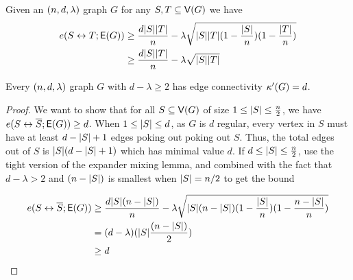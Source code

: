 \documentclass[11pt]{article}
\begin{document}
\begin{lemma}\label{lemma:expanders-mixing-lemma}
  Given an $(n, d, \lambda)$ graph $G$ for any $S, T \subseteq \mathsf{V}(G)$ we have
\begin{align*}
  e(S \leftrightarrow T; \mathsf{E}(G)) &\geq \frac{d|S||T|}{n} - \lambda\sqrt{|S||T| (1 - \frac{|S|}{n}) (1 - \frac{|T|}{n})   }	\\
  &\geq \frac{d|S||T|}{n} - \lambda\sqrt{|S||T| }
\end{align*}

\end{lemma}
\begin{lemma}\label{lemma:edge-connectivity-pseudorandom}
Every $(n, d, \lambda)$ graph $G$ with $d - \lambda \geq 2$ has edge connectivity $\kappa'(G) = d$.
\end{lemma}
\begin{proof}
  We want to show that for all $S \subseteq \mathsf{V}(G)$ of size $1 \leq |S| \leq \frac{n}{2}$, we have $e(S \leftrightarrow \overline{S}; \mathsf{E}(G)) \geq d$.
  When $1\leq |S| \leq d$, as $G$ is $d$ regular, every vertex in $S$ must have at least $d- |S| + 1$ edges poking out poking out $S$.
  Thus, the total edges out of $S$ is $|S|(d- |S| + 1)$ which has minimal value $d$.
  If $d \leq |S| \leq \frac{n}{2}$, use the tight version of the expander mixing lemma, and combined with the  fact that $d- \lambda > 2$ and $(n-|S|)$ is smallest when $|S| = n/2$ to get the bound

  \begin{align*}
    e(S \leftrightarrow \overline{S}; \mathsf{E}(G)) &\geq \frac{d|S|(n-|S|)}{n} - \lambda\sqrt{|S|(n-|S|) (1 - \frac{|S|}{n}) (1 - \frac{n-|S|}{n})   }\\
                                            &=  (d-\lambda)(|S|\frac{(n-|S|)}{2}) \\
                                              &\geq d
    \end{align*}
  
\end{proof}

\end{document}
